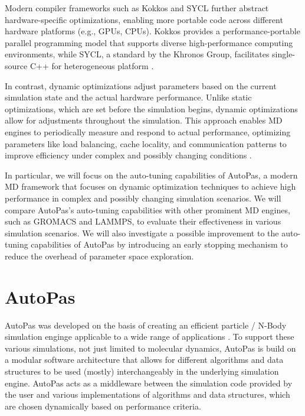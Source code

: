 \documentclass[conference]{IEEEtran}
\begin{document}
Modern compiler frameworks such as Kokkos and SYCL further abstract hardware-specific optimizations, enabling more portable code across different hardware platforms (e.g., GPUs, CPUs). Kokkos provides a performance-portable parallel programming model that supports diverse high-performance computing environments, while SYCL, a standard by the Khronos Group, facilitates single-source C++ for heterogeneous platform .

In contrast, dynamic optimizations adjust parameters based on the current simulation state and the actual hardware performance. Unlike static optimizations, which are set before the simulation begins, dynamic optimizations allow for adjustments throughout the simulation. This approach enables MD engines to periodically measure and respond to actual performance, optimizing parameters like load balancing, cache locality, and communication patterns to improve efficiency under complex and possibly changing conditions .


In particular, we will focus on the auto-tuning capabilities of AutoPas, a modern MD framework that focuses on dynamic optimization techniques to achieve high performance in complex and possibly changing simulation scenarios. We will compare AutoPas's auto-tuning capabilities with other prominent MD engines, such as GROMACS and LAMMPS, to evaluate their effectiveness in various simulation scenarios. We will also investigate a possible improvement to the auto-tuning capabilities of AutoPas by introducing an early stopping mechanism to reduce the overhead of parameter space exploration.


\section{AutoPas}

AutoPas was developed on the basis of creating an efficient particle / N-Body simulation enginge applicable to a wide range of applications \cite{Tchipev2020}. To support these various simulations, not just limited to molecular dynamics, AutoPas is build on a modular software architecture that allows for different algorithms and data structures to be used (mostly) interchangeably in the underlying simulation engine. AutoPas acts as a middleware between the simulation code provided by the user and various implementations of algorithms and data structures, which are chosen dynamically based on performance criteria.
\end{document}
